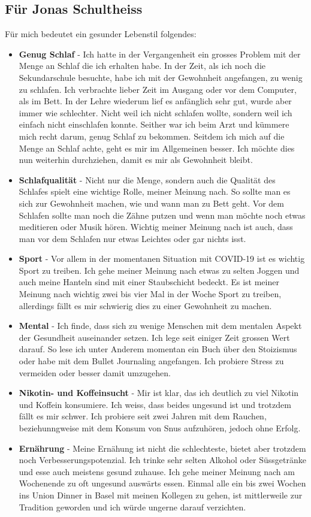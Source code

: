 \subsection{Für Jonas Schultheiss}
\authortoc{\jonas}{\subsectionident}
Für mich bedeutet ein gesunder Lebenstil folgendes:
\begin{itemize}
  \item \textbf{Genug Schlaf} - Ich hatte in der Vergangenheit ein grosses Problem mit der Menge an Schlaf die ich erhalten habe. In der Zeit, als ich noch die Sekundarschule besuchte, habe ich mit der Gewohnheit angefangen, zu wenig zu schlafen. Ich verbrachte lieber Zeit im Ausgang oder vor dem Computer, als im Bett. In der Lehre wiederum lief es anfänglich sehr gut, wurde aber immer wie schlechter. Nicht weil ich nicht schlafen wollte, sondern weil ich einfach nicht einschlafen konnte. Seither war ich beim Arzt und kümmere mich recht darum, genug Schlaf zu bekommen.
  \newline
  Seitdem ich mich auf die Menge an Schlaf achte, geht es mir im Allgemeinen besser. Ich möchte dies nun weiterhin durchziehen, damit es mir als Gewohnheit bleibt.
  \item \textbf{Schlafqualität} - Nicht nur die Menge, sondern auch die Qualität des Schlafes spielt eine wichtige Rolle, meiner Meinung nach. So sollte man es sich zur Gewohnheit machen, wie und wann man zu Bett geht. Vor dem Schlafen sollte man noch die Zähne putzen und wenn man möchte noch etwas meditieren oder Musik hören. Wichtig meiner Meinung nach ist auch, dass man vor dem Schlafen nur etwas Leichtes oder gar nichts isst.
  \item \textbf{Sport} - Vor allem in der momentanen Situation mit COVID-19 ist es wichtig Sport zu treiben. Ich gehe meiner Meinung nach etwas zu selten Joggen und auch meine Hanteln sind mit einer Staubschicht bedeckt. Es ist meiner Meinung nach wichtig zwei bis vier Mal in der Woche Sport zu treiben, allerdings fällt es mir schwierig dies zu einer Gewohnheit zu machen.
  \item \textbf{Mental} - Ich finde, dass sich zu wenige Menschen mit dem mentalen Aspekt der Gesundheit auseinander setzen. Ich lege seit einiger Zeit grossen Wert darauf. So lese ich unter Anderem momentan ein Buch über den Stoizismus oder habe mit dem Bullet Journaling angefangen. Ich probiere Stress zu vermeiden oder besser damit umzugehen.
  \item \textbf{Nikotin- und Koffeinsucht} - Mir ist klar, das ich deutlich zu viel Nikotin und Koffein konsumiere. Ich weiss, dass beides ungesund ist und trotzdem fällt es mir schwer. Ich probiere seit zwei Jahren mit dem Rauchen, beziehunngweise mit dem Konsum von Snus aufzuhören, jedoch ohne Erfolg.
  \item \textbf{Ernährung} - Meine Ernähung ist nicht die schlechteste, bietet aber trotzdem noch Verbesserungspotenzial. Ich trinke sehr selten Alkohol oder Süssgetränke und esse auch meistens gesund zuhause. Ich gehe meiner Meinung nach am Wochenende zu oft ungesund auswärts essen. Einmal alle ein bis zwei Wochen ins Union Dinner in Basel mit meinen Kollegen zu gehen, ist mittlerweile zur Tradition geworden und ich würde ungerne darauf verzichten.
\end{itemize}